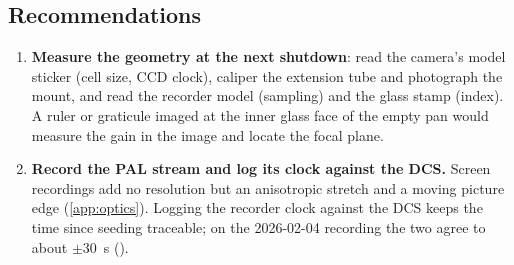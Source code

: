 \subsection{Recommendations}\label{sec:recs}

\begin{enumerate}
\item \textbf{Measure the geometry at the next shutdown}: read the camera's model sticker (cell size, CCD clock),
caliper the extension tube and photograph the mount, and read the recorder model (sampling) and the glass stamp
(index). A ruler or graticule imaged at the inner glass face of the empty pan would measure the gain in the image and
locate the focal plane.
\item \textbf{Record the PAL stream and log its clock against the DCS.} Screen recordings add no resolution but an
anisotropic stretch and a moving picture edge (\ref{app:optics}). Logging the recorder clock against the DCS
keeps the time since seeding traceable; on the 2026-02-04 recording the two agree to about $\pm 30$~s
().
\end{enumerate}
